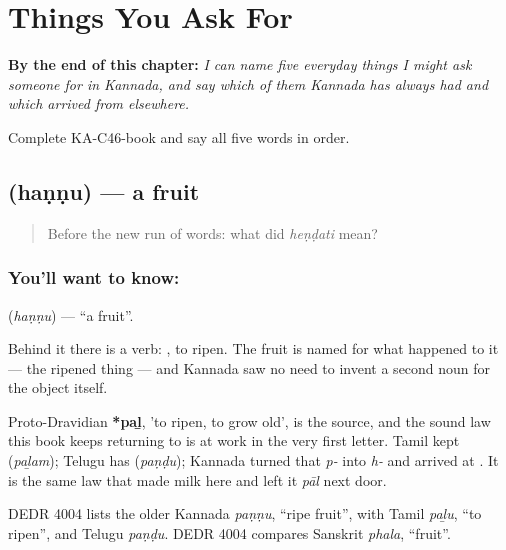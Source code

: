 
\chapter{Things You Ask For}
\label{ch:ka-ask-for}

\begin{chapteropening}
\textbf{By the end of this chapter:} \emph{I can name five everyday things I might ask someone for in Kannada, and say which of them Kannada has always had and which arrived from elsewhere.}

Complete KA-C46-book and say all five words in order.
\end{chapteropening}

\section[\texorpdfstring{\kn{ಹಣ್ಣು} (haṇṇu)}{ಹಣ್ಣು (haṇṇu)}]{ (haṇṇu) — a fruit}

\label{lesson:KA-C46-fruit}



\begin{quote}
Before the new run of words: what did \emph{heṇḍati} mean?
\end{quote}

\subsection*{You'll want to know: }
\textbf{} (\emph{haṇṇu}) — \textquotedblleft{}a fruit\textquotedblright{}.

Behind it there is a verb: , to ripen. The fruit is named for what happened to it — the ripened thing — and Kannada saw no need to invent a second noun for the object itself.

Proto-Dravidian \textbf{*paḻ}, 'to ripen, to grow old', is the source, and the sound law this book keeps returning to is at work in the very first letter. Tamil kept  (\emph{paḻam}); Telugu has  (\emph{paṇḍu}); Kannada turned that \emph{p-} into \emph{h-} and arrived at . It is the same law that made milk  here and left it \emph{pāl} next door.

DEDR 4004 lists the older Kannada \emph{paṇṇu}, \textquotedblleft{}ripe fruit\textquotedblright{}, with Tamil \emph{paḻu}, \textquotedblleft{}to ripen\textquotedblright{}, and Telugu \emph{paṇḍu}. DEDR 4004 compares Sanskrit \emph{phala}, \textquotedblleft{}fruit\textquotedblright{}.

